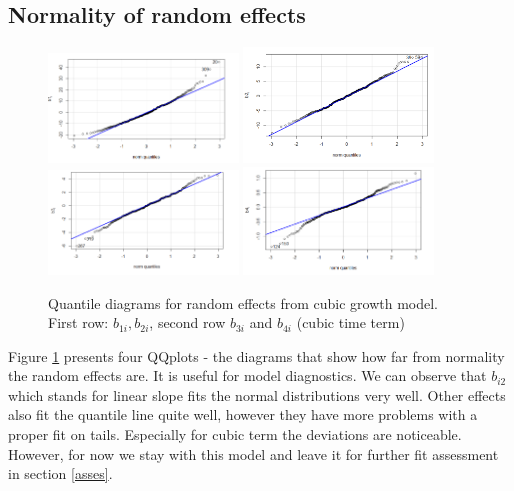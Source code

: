 \documentclass[num-refs]{wiley-article}
\begin{document}
\subsection{Normality of random effects}

\begin{figure}[H] 
\centering
\includegraphics[height=0.25\textheight, width=0.45\textwidth]{pictures/b1.png}
\hfill
\includegraphics[height=0.25\textheight, width=0.45\textwidth]{pictures/b2.png}
\vfill
\includegraphics[height=0.25\textheight, width=0.45\textwidth]{pictures/b3.png}
\hfill
\includegraphics[height=0.25\textheight, width=0.45\textwidth]{pictures/b4.png}

\caption{Quantile diagrams for random effects from cubic growth model. First row: $b_{1i}, b_{2i}$, second row $b_{3i}$ and $b_{4i}$ (cubic time term)} \label{qq}
\end{figure}

Figure \ref{qq} presents four QQplots - the diagrams that show how far from normality the random effects are. It is useful for model diagnostics. We can observe that $b_{i2}$ which stands for linear slope fits the normal distributions very well. Other effects also fit the quantile line quite well, however they have more problems with a proper fit on tails. Especially for cubic term the deviations are noticeable. However, for now we stay with this model and leave it for further fit assessment in section \ref{asses}.
\end{document}
